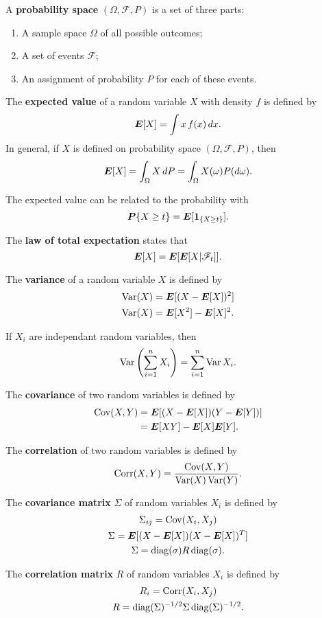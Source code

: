 \begin{outline}
\1 A \textbf{probability space} $(\Omega, \mathscr{F}, P)$ is a set of three parts:
\begin{enumerate}
\item A sample space $\Omega$ of all possible outcomes;
\item A set of events $\mathscr{F}$;
\item An assignment of probability $P$ for each of these events.
\end{enumerate}

\1 The \textbf{expected value} of a random variable $X$ with density $f$ is defined by
\[
  \bm E[X] = \int x\,f(x)\,dx.
\]
In general, if $X$ is defined on probability space $(\Omega,\mathscr{F},P)$, then 
\[
  \bm E[X] = \int_\Omega X\,dP = \int_\Omega X(\omega)P(d\omega).
\]

\1 The expected value can be related to the probability with
\[
  \bm P\{X\geq t\} = \bm E[\bm 1_{\{X\geq t\}}].
\]

\1 The \textbf{law of total expectation} states that
\[
  \bm E[X] = \bm E[\bm E[X|\mathscr{F}_t]].
\]

\1 The \textbf{variance} of a random variable $X$ is defined by
\begin{align*}
  \operatorname{Var}(X) &= \bm E[(X-\bm E[X])^2]\\
  \operatorname{Var}(X) &= \bm E[X^2] - \bm E[X]^2.
\end{align*}

\1 If $X_i$ are independant random variables, then
\[
  \operatorname{Var}\left(\sum_{i=1}^n X_i\right) = \sum_{i=1}^n\operatorname{Var} X_i.
\]

\1 The \textbf{covariance} of two random variables is defined by
\begin{align*}
  \operatorname{Cov}(X,Y) &= \bm E[(X-\bm E[X])(Y-\bm E[Y])]\\
            &= \bm E[XY] - \bm E[X]\bm E[Y].
\end{align*}

\1 The \textbf{correlation} of two random variables is defined by
\[
  \operatorname{Corr}(X,Y) = \frac{\operatorname{Cov}(X,Y)}{\operatorname{Var}(X)\operatorname{Var}(Y)}.
\]

\1 The \textbf{covariance matrix} $\Sigma$ of random variables $X_i$ is defined by
\begin{gather*}
  \Sigma_{ij} = \operatorname{Cov}(X_i,X_j)\\
  \Sigma = \bm E[(X-\bm E[X])(X-\bm E[X])^T]\\
  \Sigma = \operatorname{diag}(\sigma)R\operatorname{diag}(\sigma).
\end{gather*}

\1 The \textbf{correlation matrix} $R$ of random variables $X_i$ is defined by
\begin{gather*}
  R_{i}= \operatorname{Corr}(X_i,X_j)\\
  R = \operatorname{diag}(\Sigma)^{-1/2}\Sigma\operatorname{diag}(\Sigma)^{-1/2}.
\end{gather*}


\end{outline}
